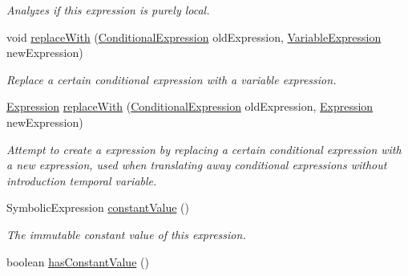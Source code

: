 \begin{DoxyCompactItemize}
\begin{DoxyCompactList}\small\item\em Analyzes if this expression is purely local. \end{DoxyCompactList}\item 
void \hyperlink{classedu_1_1udel_1_1cis_1_1vsl_1_1civl_1_1model_1_1common_1_1expression_1_1CommonExpression_a6184c0bb02bc16f273207d374f28dfd7}{replace\+With} (\hyperlink{interfaceedu_1_1udel_1_1cis_1_1vsl_1_1civl_1_1model_1_1IF_1_1expression_1_1ConditionalExpression}{Conditional\+Expression} old\+Expression, \hyperlink{interfaceedu_1_1udel_1_1cis_1_1vsl_1_1civl_1_1model_1_1IF_1_1expression_1_1VariableExpression}{Variable\+Expression} new\+Expression)
\begin{DoxyCompactList}\small\item\em Replace a certain conditional expression with a variable expression. \end{DoxyCompactList}\item 
\hyperlink{interfaceedu_1_1udel_1_1cis_1_1vsl_1_1civl_1_1model_1_1IF_1_1expression_1_1Expression}{Expression} \hyperlink{classedu_1_1udel_1_1cis_1_1vsl_1_1civl_1_1model_1_1common_1_1expression_1_1CommonExpression_a10583a630dc5c7159ab6279e889c80e0}{replace\+With} (\hyperlink{interfaceedu_1_1udel_1_1cis_1_1vsl_1_1civl_1_1model_1_1IF_1_1expression_1_1ConditionalExpression}{Conditional\+Expression} old\+Expression, \hyperlink{interfaceedu_1_1udel_1_1cis_1_1vsl_1_1civl_1_1model_1_1IF_1_1expression_1_1Expression}{Expression} new\+Expression)
\begin{DoxyCompactList}\small\item\em Attempt to create a expression by replacing a certain conditional expression with a new expression, used when translating away conditional expressions without introduction temporal variable. \end{DoxyCompactList}\item 
Symbolic\+Expression \hyperlink{classedu_1_1udel_1_1cis_1_1vsl_1_1civl_1_1model_1_1common_1_1expression_1_1CommonExpression_aab292ce8602a2780107dcb6780d7eadf}{constant\+Value} ()
\begin{DoxyCompactList}\small\item\em The immutable constant value of this expression. \end{DoxyCompactList}\item 
boolean \hyperlink{classedu_1_1udel_1_1cis_1_1vsl_1_1civl_1_1model_1_1common_1_1expression_1_1CommonExpression_a4f79036593ad1b2686385928a581b33d}{has\+Constant\+Value} ()

\end{DoxyCompactItemize}

